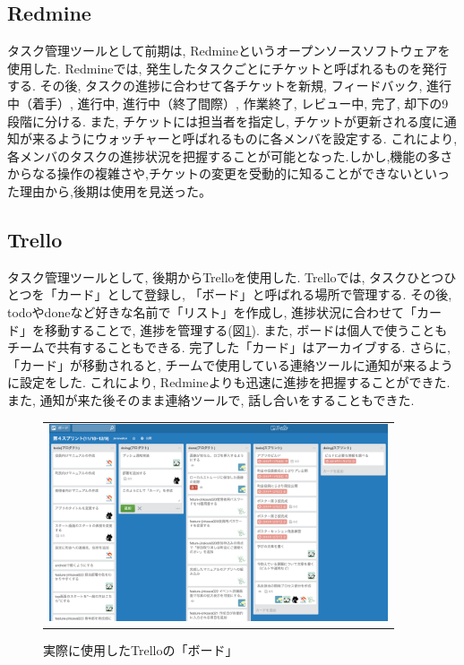 \subsection{Redmine}%
タスク管理ツールとして前期は, Redmineというオープンソースソフトウェアを使用した. Redmineでは, 発生したタスクごとにチケットと呼ばれるものを発行する. その後, タスクの進捗に合わせて各チケットを新規, フィードバック, 進行中（着手）, 進行中, 進行中（終了間際）, 作業終了, レビュー中, 完了, 却下の9段階に分ける. また, チケットには担当者を指定し, チケットが更新される度に通知が来るようにウォッチャーと呼ばれるものに各メンバを設定する. これにより, 各メンバのタスクの進捗状況を把握することが可能となった.しかし,機能の多さからなる操作の複雑さや,チケットの変更を受動的に知ることができないといった理由から,後期は使用を見送った。

\subsection{Trello}%
タスク管理ツールとして, 後期からTrelloを使用した. Trelloでは, タスクひとつひとつを「カード」として登録し, 「ボード」と呼ばれる場所で管理する\cite{Trello}. その後, todoやdoneなど好きな名前で「リスト」を作成し, 進捗状況に合わせて「カード」を移動することで, 進捗を管理する\cite{Trello}(図\ref{fig:image_trello}). また, ボードは個人で使うこともチームで共有することもできる\cite{Trello}. 完了した「カード」はアーカイブする. さらに, 「カード」が移動されると, チームで使用している連絡ツールに通知が来るように設定をした. これにより, Redmineよりも迅速に進捗を把握することができた. また, 通知が来た後そのまま連絡ツールで, 話し合いをすることもできた.
\begin{figure}[htbp]
  \begin{center}
    \begin{tabular}{c}

      \begin{minipage}{0.7\hsize}
        \begin{center}
\includegraphics[width=10cm]{about_trello.png}
          \hspace{1cm} %
        \end{center}
      \end{minipage}

    \end{tabular}
    \caption{実際に使用したTrelloの「ボード」}
    \label{fig:image_trello}
  \end{center}
\end{figure}

